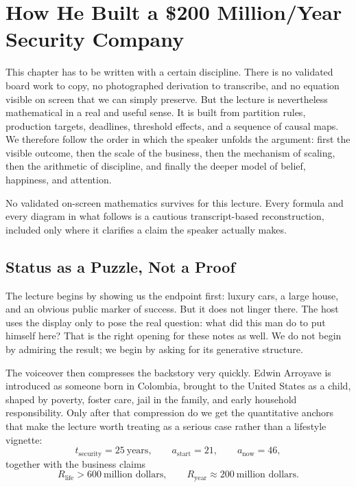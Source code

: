 \chapter{How He Built a \$200 Million/Year Security Company}

This chapter has to be written with a certain discipline. There is no validated board work to copy, no photographed derivation to transcribe, and no equation visible on screen that we can simply preserve. But the lecture is nevertheless mathematical in a real and useful sense. It is built from partition rules, production targets, deadlines, threshold effects, and a sequence of causal maps. We therefore follow the order in which the speaker unfolds the argument: first the visible outcome, then the scale of the business, then the mechanism of scaling, then the arithmetic of discipline, and finally the deeper model of belief, happiness, and attention.

\begin{remark}
No validated on-screen mathematics survives for this lecture. Every formula and every diagram in what follows is a cautious transcript-based reconstruction, included only where it clarifies a claim the speaker actually makes.
\end{remark}

\section{Status as a Puzzle, Not a Proof}

The lecture begins by showing us the endpoint first: luxury cars, a large house, and an obvious public marker of success. But it does not linger there. The host uses the display only to pose the real question: what did this man do to put himself here? That is the right opening for these notes as well. We do not begin by admiring the result; we begin by asking for its generative structure.

The voiceover then compresses the backstory very quickly. Edwin Arroyave is introduced as someone born in Colombia, brought to the United States as a child, shaped by poverty, foster care, jail in the family, and early household responsibility. Only after that compression do we get the quantitative anchors that make the lecture worth treating as a serious case rather than a lifestyle vignette:
\begin{equation}
t_{\mathrm{security}} = 25\ \text{years},\qquad
a_{\mathrm{start}} = 21,\qquad
a_{\mathrm{now}} = 46,
\end{equation}
together with the business claims
\begin{equation}
R_{\mathrm{life}} > 600\ \text{million dollars},\qquad
R_{\mathrm{year}} \approx 200\ \text{million dollars}.
\end{equation}

